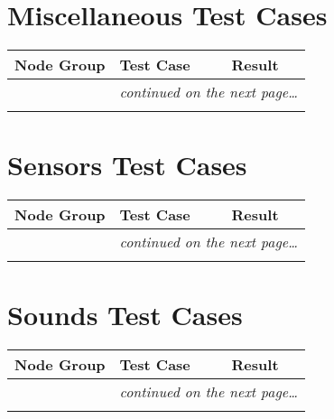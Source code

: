 \documentclass[12pt,letterpaper]{article}
\newcounter{testCaseCtr}
\newcommand{\resetTestCase}{\setcounter{testCaseCtr}{1}}
\begin{document}
\section{Miscellaneous Test Cases}
\resetTestCase

\begin{center}
\setlongtables
\begin{longtable}{|l|l|l|}
\hline
\textbf{Node Group} & \textbf{Test Case} & \textbf{Result} \\
\hline\hline
\endhead
 & \multicolumn{2}{|r|}{\textsl{continued on the next page\ldots}} \\
\hline
\endfoot
\hline
\endlastfoot
& & \\
\cline{2-3}
\end{longtable}
\end{center}

\section{Sensors Test Cases}
\resetTestCase

\begin{center}
\setlongtables
\begin{longtable}{|l|l|l|}
\hline
\textbf{Node Group} & \textbf{Test Case} & \textbf{Result} \\
\hline\hline
\endhead
 & \multicolumn{2}{|r|}{\textsl{continued on the next page\ldots}} \\
\hline
\endfoot
\hline
\endlastfoot
& & \\
\cline{2-3}
\end{longtable}
\end{center}

\section{Sounds Test Cases}
\resetTestCase

\begin{center}
\setlongtables
\begin{longtable}{|l|l|l|}
\hline
\textbf{Node Group} & \textbf{Test Case} & \textbf{Result} \\
\hline\hline
\endhead
 & \multicolumn{2}{|r|}{\textsl{continued on the next page\ldots}} \\
\hline
\endfoot
\hline
\endlastfoot
& & \\
\cline{2-3}
\end{longtable}
\end{center}
\end{document}
